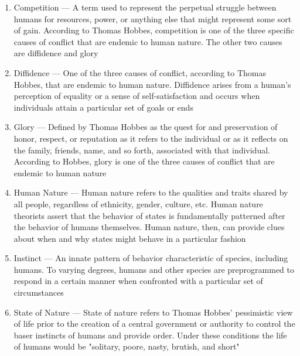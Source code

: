 \documentclass[12pt]{article}
\begin{document}
\begin{enumerate}
        \begin{enumerate}

          \item Competition — A term used to represent the perpetual struggle between humans for resources, power, or anything else that might represent some sort of gain. According to Thomas Hobbes, competition is one of the three specific causes of conflict that are endemic to human nature.  The other two causes are diffidence and glory

          \item Diffidence — One of the three causes of conflict, according to Thomas Hobbes, that are endemic to human nature. Diffidence arises from a human's perception of equality or a sense of self-satisfaction and occurs when individuals attain a particular set of goals or ends

          \item Glory — Defined by Thomas Hobbes as the quest for and preservation of honor, respect, or reputation as it refers to the individual or as it reflects on the family, friends, name, and so forth, associated with that individual. According to Hobbes, glory is one of the three causes of conflict that are endemic to human nature

          \item Human Nature — Human nature refers to the qualities and traits shared by all people, regardless of ethnicity, gender, culture, etc. Human nature theorists assert that the behavior of states is fundamentally patterned after the behavior of humans themselves. Human nature, then, can provide clues about when and why states might behave in a particular fashion

          \item Instinct — An innate pattern of behavior characteristic of species, including humans. To varying degrees, humans and other species are preprogrammed to respond in a certain manner when confronted with a particular set of circumstances

          \item State of Nature — State of nature refers to Thomas Hobbes' pessimistic view of life prior to the creation of a central government or authority to control the baser instincts of humans and provide order. Under these conditions the life of humans would be "solitary, poore, nasty, brutish, and short"  

        \end{enumerate}


\end{enumerate}
\end{document}

